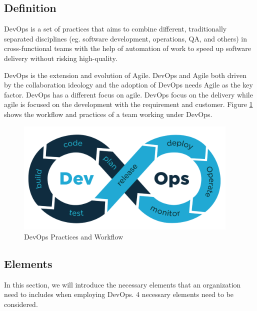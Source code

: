 \subsection{Definition}
\label{devops}
DevOps is a set of practices that aims to combine different, traditionally separated disciplines (eg. software development, operations, QA, and others) in cross-functional teams with the help of automation of work to speed up software delivery without risking high-quality.\cite{bass2015devops}
\par
DevOps is the extension and evolution\cite{lwakatare2016relationship}\cite{leite2019survey} of Agile. DevOps and Agile both driven by the collaboration ideology and the adoption of DevOps needs Agile as the key factor.\cite{lwakatare2016relationship} DevOps has a different focus on agile. DevOps focus on the delivery while agile is focused on the development with the requirement and customer. Figure \ref{fig:DevOps}\cite{DevOpsin72:online} shows the workflow and practices of a team working under DevOps.
\begin{figure}[h]
    \centering
    \includegraphics[width=0.95\textwidth]{pics/DevOps.png}
    \caption{DevOps Practices and Workflow}
    \label{fig:DevOps}
\end{figure}
\subsection{Elements}
In this section, we will introduce the necessary elements that an organization need to includes when employing DevOps. 4 necessary elements need to be considered.
